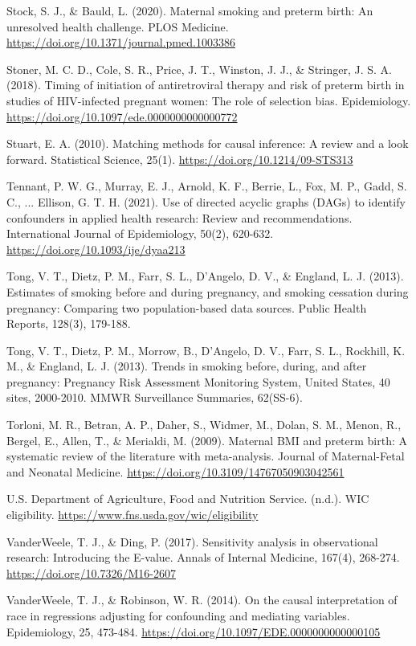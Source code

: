 \documentclass[11pt,letterpaper]{article}
\begin{document}
{Stock, S. J., \& Bauld, L. (2020). Maternal smoking and preterm birth: An unresolved health challenge. PLOS Medicine. \url{https://doi.org/10.1371/journal.pmed.1003386}

Stoner, M. C. D., Cole, S. R., Price, J. T., Winston, J. J., \& Stringer, J. S. A. (2018). Timing of initiation of antiretroviral therapy and risk of preterm birth in studies of HIV-infected pregnant women: The role of selection bias. Epidemiology. \url{https://doi.org/10.1097/ede.0000000000000772}

Stuart, E. A. (2010). Matching methods for causal inference: A review and a look forward. Statistical Science, 25(1). \url{https://doi.org/10.1214/09-STS313}

Tennant, P. W. G., Murray, E. J., Arnold, K. F., Berrie, L., Fox, M. P., Gadd, S. C., ... Ellison, G. T. H. (2021). Use of directed acyclic graphs (DAGs) to identify confounders in applied health research: Review and recommendations. International Journal of Epidemiology, 50(2), 620-632. \url{https://doi.org/10.1093/ije/dyaa213}

Tong, V. T., Dietz, P. M., Farr, S. L., D'Angelo, D. V., \& England, L. J. (2013). Estimates of smoking before and during pregnancy, and smoking cessation during pregnancy: Comparing two population-based data sources. Public Health Reports, 128(3), 179-188.

Tong, V. T., Dietz, P. M., Morrow, B., D'Angelo, D. V., Farr, S. L., Rockhill, K. M., \& England, L. J. (2013). Trends in smoking before, during, and after pregnancy: Pregnancy Risk Assessment Monitoring System, United States, 40 sites, 2000-2010. MMWR Surveillance Summaries, 62(SS-6).

Torloni, M. R., Betran, A. P., Daher, S., Widmer, M., Dolan, S. M., Menon, R., Bergel, E., Allen, T., \& Merialdi, M. (2009). Maternal BMI and preterm birth: A systematic review of the literature with meta-analysis. Journal of Maternal-Fetal and Neonatal Medicine. \url{https://doi.org/10.3109/14767050903042561}

U.S. Department of Agriculture, Food and Nutrition Service. (n.d.). WIC eligibility. \url{https://www.fns.usda.gov/wic/eligibility}

VanderWeele, T. J., \& Ding, P. (2017). Sensitivity analysis in observational research: Introducing the E-value. Annals of Internal Medicine, 167(4), 268-274. \url{https://doi.org/10.7326/M16-2607}

VanderWeele, T. J., \& Robinson, W. R. (2014). On the causal interpretation of race in regressions adjusting for confounding and mediating variables. Epidemiology, 25, 473-484. \url{https://doi.org/10.1097/EDE.0000000000000105}

}
\end{document}
